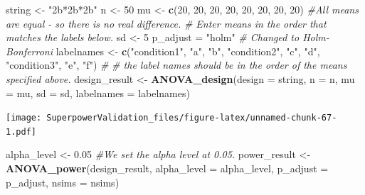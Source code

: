 \documentclass[]{book}
\newenvironment{Shaded}{\begin{snugshade}}{\end{snugshade}}
\newcommand{\CommentTok}[1]{\textcolor[rgb]{0.56,0.35,0.01}{\textit{#1}}}
\newcommand{\DataTypeTok}[1]{\textcolor[rgb]{0.13,0.29,0.53}{#1}}
\newcommand{\DecValTok}[1]{\textcolor[rgb]{0.00,0.00,0.81}{#1}}
\newcommand{\FloatTok}[1]{\textcolor[rgb]{0.00,0.00,0.81}{#1}}
\newcommand{\KeywordTok}[1]{\textcolor[rgb]{0.13,0.29,0.53}{\textbf{#1}}}
\newcommand{\NormalTok}[1]{#1}
\newcommand{\StringTok}[1]{\textcolor[rgb]{0.31,0.60,0.02}{#1}}
\begin{document}
\begin{Shaded}
\begin{Highlighting}[]
\NormalTok{string <-}\StringTok{ "2b*2b*2b"}
\NormalTok{n <-}\StringTok{ }\DecValTok{50}
\NormalTok{mu <-}\StringTok{ }\KeywordTok{c}\NormalTok{(}\DecValTok{20}\NormalTok{, }\DecValTok{20}\NormalTok{, }\DecValTok{20}\NormalTok{, }\DecValTok{20}\NormalTok{, }\DecValTok{20}\NormalTok{, }\DecValTok{20}\NormalTok{, }\DecValTok{20}\NormalTok{, }\DecValTok{20}\NormalTok{) }\CommentTok{#All means are equal - so there is no real difference.}
\CommentTok{# Enter means in the order that matches the labels below.}
\NormalTok{sd <-}\StringTok{ }\DecValTok{5}
\NormalTok{p_adjust =}\StringTok{ "holm"}
\CommentTok{# Changed to Holm-Bonferroni}
\NormalTok{labelnames <-}\StringTok{ }\KeywordTok{c}\NormalTok{(}\StringTok{"condition1"}\NormalTok{, }\StringTok{"a"}\NormalTok{, }\StringTok{"b"}\NormalTok{, }\StringTok{"condition2"}\NormalTok{, }\StringTok{"c"}\NormalTok{, }\StringTok{"d"}\NormalTok{, }\StringTok{"condition3"}\NormalTok{, }\StringTok{"e"}\NormalTok{, }\StringTok{"f"}\NormalTok{) }\CommentTok{#}
\CommentTok{# the label names should be in the order of the means specified above.}
\NormalTok{design_result <-}\StringTok{ }\KeywordTok{ANOVA_design}\NormalTok{(}\DataTypeTok{design =}\NormalTok{ string,}
                   \DataTypeTok{n =}\NormalTok{ n, }
                   \DataTypeTok{mu =}\NormalTok{ mu, }
                   \DataTypeTok{sd =}\NormalTok{ sd, }
                   \DataTypeTok{labelnames =}\NormalTok{ labelnames)}
\end{Highlighting}
\end{Shaded}

\texttt{[image: SuperpowerValidation\_files/figure-latex/unnamed-chunk-67-1.pdf]}

\begin{Shaded}
\begin{Highlighting}[]
\NormalTok{alpha_level <-}\StringTok{ }\FloatTok{0.05}
\CommentTok{#We set the alpha level at 0.05. }
\NormalTok{power_result <-}\StringTok{ }\KeywordTok{ANOVA_power}\NormalTok{(design_result, }
                            \DataTypeTok{alpha_level =}\NormalTok{ alpha_level,}
                            \DataTypeTok{p_adjust =}\NormalTok{ p_adjust,}
                            \DataTypeTok{nsims =}\NormalTok{ nsims)}
\end{Highlighting}
\end{Shaded}
\end{document}
